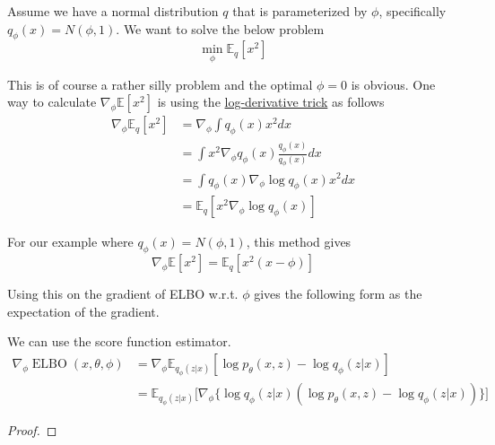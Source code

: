 \documentclass{article}
\DeclareMathOperator{\elbo}{ELBO}
\begin{document}
  \begin{example}[Gradient of Expection of $f(x) = x^2$ w.r.t. Gaussian]
    \label{ex:gradient-of-expection-of-fxx2-w-r-t-gaussian}
    Assume we have a normal distribution $q$ that is parameterized by $\phi$, specifically
    $q_\phi(x) = N(\phi, 1)$. We want to solve the below problem
    \begin{equation}
      \min_\phi \mathbb{E}_q[x^2]
    \end{equation}

    This is of course a rather silly problem and the optimal $\phi = 0$ is obvious. One way to calculate $\nabla_\phi \mathbb{E}[x^2]$ is using the \hyperref[thm:log-derivative-trick]{log-derivative trick} as follows
    \begin{align}
      \nabla_\phi \mathbb{E}_q[x^2] &= \nabla_\phi\int q_\phi(x)x^2dx \\
      &= \int x^2\nabla_\phi q_\phi(x)\frac{q_\phi(x)}{q_\phi(x)}dx \\
      &= \int q_\phi(x)\nabla_\phi\log q_\phi(x)x^2dx \\
      &= \mathbb{E}_q[x^2\nabla_\phi\log q_\phi(x)]
    \end{align}

    For our example where $q_\phi(x) = N(\phi, 1)$, this method gives
    \begin{equation}
      \nabla_\phi \mathbb{E}[x^2] = \mathbb{E}_q[x^2(x-\phi)]
    \end{equation}
  \end{example}

  Using this on the gradient of ELBO w.r.t. $\phi$ gives the following form as the expectation of the gradient. 

  \begin{lemma}
    \label{thm:score-function-estimator-for-the-elbo}
    We can use the score function estimator. 
    \begin{align}
      \nabla_\phi \elbo(x, \theta, \phi) & = \nabla_\phi \mathbb{E}_{q_\phi(z|x)}[\log p_\theta(x,z) - \log q_\phi(z|x)] \\
                                         & = \mathbb{E}_{q_\phi(z|x)}\big[ \nabla_\phi \big\{ \log q_\phi(z|x)(\log p_\theta(x,z) - \log q_\phi(z|x)) \big\} \big]
    \end{align}
  \end{lemma}
  \begin{proof}
  \end{proof}
\end{document}
